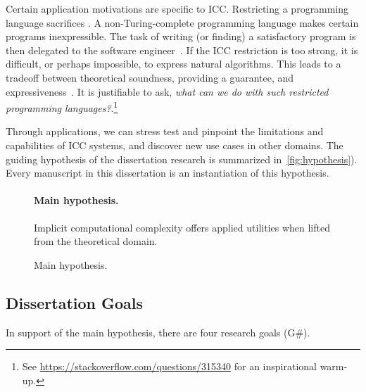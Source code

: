 Certain application motivations are specific to ICC. Restricting a programming
language sacrifices . A non-Turing-complete programming
language makes certain programs inexpressible. The task of writing (or finding)
a satisfactory program is then delegated to the software engineer~\cite[p.
14]{moyen2017}. If the ICC restriction is too strong, it is difficult, or
perhaps impossible, to express natural algorithms. This leads to a tradeoff
between theoretical soundness, \ie providing a guarantee, and
expressiveness~\cite{feree2018}. It is justifiable to ask, \emph{what can we
do with such restricted programming languages?}.\footnote{See
\url{https://stackoverflow.com/questions/315340} for an inspirational warm-up.}

Through applications, we can stress test and pinpoint the limitations and
capabilities of ICC systems, and discover new use cases in other domains. The
guiding hypothesis of the dissertation research is summarized
in~\autoref{fig:hypothesis}). Every manuscript in this dissertation is an
instantiation of this hypothesis.

\begin{figure}[h]
\begin{mdframed}
\paragraph*{Main hypothesis.}
Implicit computational complexity offers applied utilities when lifted from the
theoretical domain.
\end{mdframed}
\caption[Main hypothesis summarized]{Main hypothesis.}
\label{fig:hypothesis}
\end{figure}

\subsection{Dissertation Goals}\label{subsec:specific-aims}

In support of the main hypothesis, there are four research goals (G\#).

